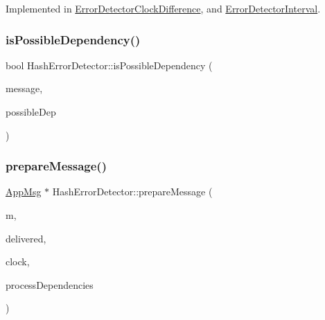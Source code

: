 Implemented in \hyperlink{class_error_detector_clock_difference_ab20aa1671eb558dea6f06b2440e97e41}{Error\+Detector\+Clock\+Difference}, and \hyperlink{class_error_detector_interval_a33bf470042fb65d833fd0f091374a046}{Error\+Detector\+Interval}.

\mbox{\label{class_hash_error_detector_aaaceeb3d2d27d5f3c85a9b80f959e0fe}} 
\subsubsection{\texorpdfstring{is\+Possible\+Dependency()}{isPossibleDependency()}}
{\footnotesize\ttfamily bool Hash\+Error\+Detector\+::is\+Possible\+Dependency (\begin{DoxyParamCaption}\item[{const \hyperlink{structures_8h_a7e7bdc1d2fff8a9436f2f352b2711ed6}{message\+Info} \&}]{message,  }\item[{const \hyperlink{structures_8h_a7e7bdc1d2fff8a9436f2f352b2711ed6}{message\+Info} \&}]{possible\+Dep }\end{DoxyParamCaption})}

\mbox{\label{class_hash_error_detector_a2b1dad6a83a08fd7ce88e32f84638459}} 
\subsubsection{\texorpdfstring{prepare\+Message()}{prepareMessage()}}
{\footnotesize\ttfamily \hyperlink{class_app_msg}{App\+Msg} $\ast$ Hash\+Error\+Detector\+::prepare\+Message (\begin{DoxyParamCaption}\item[{\hyperlink{class_app_msg}{App\+Msg} $\ast$}]{m,  }\item[{const vector$<$ \hyperlink{structures_8h_a7e7bdc1d2fff8a9436f2f352b2711ed6}{message\+Info} $>$ \&}]{delivered,  }\item[{const \hyperlink{class_probabilistic_clock}{Probabilistic\+Clock} \&}]{clock,  }\item[{const \hyperlink{class_total_dependencies}{Total\+Dependencies} \&}]{process\+Dependencies }\end{DoxyParamCaption})\hspace{0.3cm}{\ttfamily [virtual]}}



